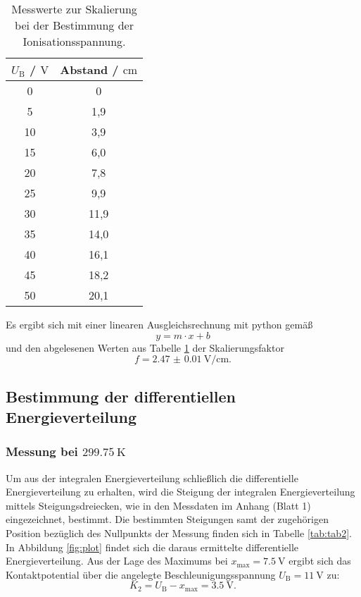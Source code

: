 \begin{table}
	\centering
	\caption{Messwerte zur Skalierung bei der Bestimmung der Ionisationsspannung.}
	\label{tab:c}
	\begin{tabular}{cc}
		\toprule
		$U_{\mathrm{B}}$ / $\si{\volt}$ & Abstand / $\si{\centi\meter}$ \\
		\midrule
		0 & 0 \\
		5 & 1,9 \\
		10 & 3,9 \\
		15 & 6,0 \\
		20 & 7,8 \\
		25 & 9,9 \\
		30 & 11,9 \\
		35 & 14,0 \\
		40 & 16,1 \\
		45 & 18,2 \\
		50 & 20,1 \\
		\bottomrule
	\end{tabular}
\end{table}
Es ergibt sich mit einer linearen Ausgleichsrechnung mit python \cite{python} gemäß
\begin{equation*}
	y = m \cdot x + b
\end{equation*}
und den abgelesenen Werten aus Tabelle \ref{tab:c} der Skalierungsfaktor
\begin{equation*}
	f = \SI{2.47(1)}{\volt\per\centi\meter} \mathrm{.}
\end{equation*}

\FloatBarrier
\subsection{Bestimmung der differentiellen Energieverteilung}
\subsubsection{Messung bei $\SI{299.75}{\kelvin}$}
Um aus der integralen Energieverteilung schließlich die differentielle Energieverteilung zu erhalten, wird die Steigung der integralen Energieverteilung mittels Steigungsdreiecken, wie in den Messdaten im Anhang
(Blatt 1) eingezeichnet, bestimmt.
Die bestimmten Steigungen samt der zugehörigen Position bezüglich des Nullpunkts der Messung finden sich in Tabelle \ref{tab:tab2}.
In Abbildung \ref{fig:plot} findet sich die daraus ermittelte differentielle Energieverteilung. Aus der Lage des Maximums bei $x_{\mathrm{max}}=\SI{7.5}{\volt}$ ergibt sich das Kontaktpotential über die angelegte Beschleunigungsspannung $U_\mathrm{B}=\SI{11}{\volt}$ zu:
\begin{equation}
	K_2=U_\mathrm{B}-x_\mathrm{max}=\SI{3.5}{\volt} \text{.}
\end{equation}

